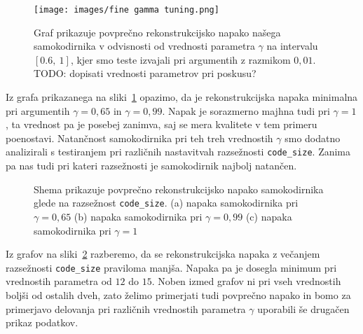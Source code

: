 \documentclass[12pt,a4paper,twoside]{article}
\theoremstyle{definition} %
\theoremstyle{plain} %
\numberwithin{equation}{section}  %
\begin{document}
\begin{figure}[h]
	\centering
	\texttt{[image: images/fine gamma tuning.png]}
	\caption[Podrobnejši graf napake glede na $\gamma$.]{Graf prikazuje povprečno rekonstrukcijsko napako našega 
	samokodirnika v odvisnosti od vrednosti parametra $\gamma$ na intervalu $[0.6,\ 1]$, kjer smo teste izvajali pri argumentih z razmikom $0,01$. 
	TODO: dopisati vrednosti parametrov pri poskusu?}
	\label{fig:gamma_fine}
\end{figure}

Iz grafa prikazanega na sliki~\ref{fig:gamma_fine} opazimo, da je rekonstrukcijska napaka minimalna pri argumentih $\gamma=0,65$ in $\gamma=0,99$.
Napak je sorazmerno majhna tudi pri $\gamma=1$, ta vrednost pa je posebej zanimva, saj se mera kvalitete v tem primeru poenostavi.
Natančnost samokodirnika pri teh treh vrednostih $\gamma$ smo dodatno analizirali s testiranjem pri različnih nastavitvah razsežnosti \texttt{code\_size}.
Zanima pa nas tudi pri kateri razsežnosti je samokodirnik najbolj natančen.

\begin{figure}[h]
	\centering
	\caption[Tri grafi napake glede na \texttt{code\_size}]{Shema prikazuje povprečno rekonstrukcijsko napako samokodirnika glede na razsežnost \texttt{code\_size}.
		(a) napaka samokodirnika pri $\gamma = 0,65$ 
		(b) napaka samokodirnika pri $\gamma = 0,99$ 
		(c) napaka samokodirnika pri $\gamma = 1$}
	\label{fig:triple_code_size}
\end{figure}

Iz grafov na sliki~\ref{fig:triple_code_size} razberemo, da se rekonstrukcijska napaka z večanjem razsežnosti \texttt{code\_size} praviloma manjša.
Napaka pa je dosegla minimum pri vrednostih parametra od $12$ do $15$.
Noben izmed grafov ni pri vseh vrednostih boljši od ostalih dveh, 
zato želimo primerjati tudi povprečno napako in bomo za primerjavo delovanja pri različnih vrednostih parametra $\gamma$ uporabili še drugačen prikaz podatkov.
\end{document}
